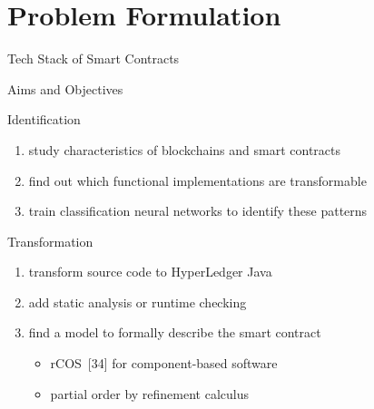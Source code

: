 \documentclass[xcolor=svgnames]{beamer}
\begin{document}
\section{Problem Formulation}

\begin{frame}{Tech Stack of Smart Contracts}



\end{frame}


\begin{frame}{Aims and Objectives}

Identification\\
\begin{enumerate}
\item study characteristics of blockchains and smart contracts
\item find out which functional implementations are transformable
\item train classification neural networks to identify these patterns
\end{enumerate}

Transformation\\
\begin{enumerate}
\item transform source code to HyperLedger Java
\item add static analysis or runtime checking
\item find a model to formally describe the smart contract
	\begin{itemize}
	\item rCOS~[34] for component-based software
	\item partial order by refinement calculus
	\end{itemize}
\end{enumerate}

\end{frame}
\end{document}

